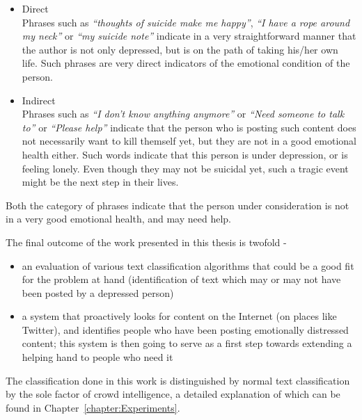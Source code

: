 \begin{itemize}
    \item{
    Direct\\
    Phrases such as \emph{``thoughts of suicide make me happy''}, \emph{``I have a rope around my neck''} or \emph{``my suicide note''} indicate in a very straightforward manner that the author is not only depressed, but is on the path of taking his/her own life. Such phrases are very direct indicators of the emotional condition of the person.
    }
    \item{
    Indirect\\
    Phrases such as \emph{``I don't know anything anymore''} or \emph{``Need someone to talk to''} or \emph{``Please help''} indicate that the person who is posting such content does not necessarily want to kill themself yet, but they are not in a good emotional health either. Such words indicate that this person is under depression, or is feeling lonely. Even though they may not be suicidal yet, such a tragic event might be the next step in their lives. 
    }
\end{itemize}

Both the category of phrases indicate that the person under consideration is not in a very good emotional health, and may need help.

The final outcome of the work presented in this thesis is twofold -
\begin{itemize}
    \item{an evaluation of various text classification algorithms that could be a good fit for the problem at hand (identification of text which may or may not have been posted by a depressed person)}
    \item{a system that proactively looks for content on the Internet (on places like Twitter), and identifies people who have been posting emotionally distressed content; this system is then going to serve as a first step towards extending a helping hand to people who need it}
\end{itemize}
The classification done in this work is distinguished by normal text classification by the sole factor of crowd intelligence, a detailed explanation of which can be found in Chapter~\ref{chapter:Experiments}.
